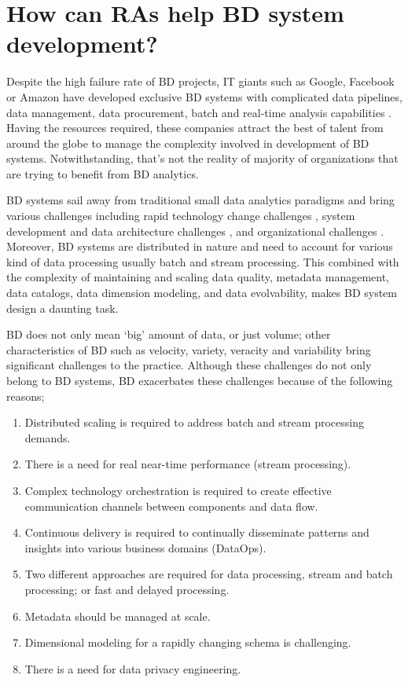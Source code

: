 \documentclass{ieeeaccess}
\begin{document}
\section{How can RAs help BD system development? }

Despite the high failure rate of BD projects, IT giants such as Google, Facebook or Amazon have developed exclusive BD systems with complicated data pipelines, data management, data procurement, batch and real-time analysis capabilities \cite{kohler2019towards}. Having the resources required, these companies attract the best of talent from around the globe to manage the complexity involved in development of BD systems. Notwithstanding, that’s not the reality of majority of organizations that are trying to benefit from BD analytics. 

BD systems sail away from traditional small data analytics paradigms and bring various challenges including rapid technology change challenges \cite{chen2017big}, system development and data architecture challenges \cite{jagadish2014big}, and organizational challenges \cite{AtaeiHype}. Moreover, BD systems are distributed in nature and need to account for various kind of data processing usually batch and stream processing. This combined with the complexity of maintaining and scaling data quality, metadata management, data catalogs, data dimension modeling, and data evolvability, makes BD system design a daunting task. 

BD does not only mean ‘big’ amount of data, or just volume; other characteristics of BD such as velocity, variety, veracity and variability bring significant challenges to the practice. Although these challenges do not only belong to BD systems, BD exacerbates these challenges because of the following reasons;

\begin{enumerate}
    \item Distributed scaling is required to address batch and stream processing demands.
    \item There is a need for real near-time performance (stream processing).
    \item Complex technology orchestration is required to create effective communication channels between components and data flow.
    \item Continuous delivery is required to continually disseminate patterns and insights into various business domains (DataOps).
    \item Two different approaches are required for data processing, stream and batch processing; or fast and delayed processing.
    \item Metadata should be managed at scale. 
    \item Dimensional modeling for a rapidly changing schema is challenging. 
    \item There is a need for data privacy engineering.
\end{enumerate}
\end{document}
